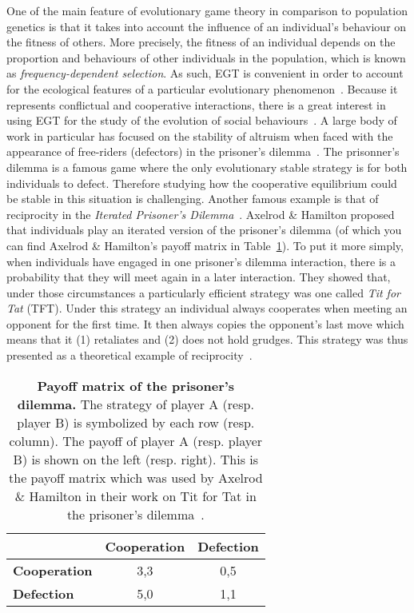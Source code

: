             One of the main feature of evolutionary game theory in comparison to population genetics is that it takes into account the influence of an individual's behaviour on the fitness of others. More precisely, the fitness of an individual depends on the proportion and behaviours of other individuals in the population, which is known as \emph{frequency-dependent selection}. As such, EGT is convenient in order to account for the ecological features of a particular evolutionary phenomenon~\parencite{Hammerstein1994}. Because it represents conflictual and cooperative interactions, there is a great interest in using EGT for the study of the evolution of social behaviours~\parencite{Bshary2015}. A large body of work in particular has focused on the stability of altruism when faced with the appearance of free-riders (defectors) in the prisoner's dilemma~\parencite{Requejo2013a}. The prisonner's dilemma is a famous game where the only evolutionary stable strategy is for both individuals to defect. Therefore studying how the cooperative equilibrium could be stable in this situation is challenging. Another famous example is that of reciprocity in the \emph{Iterated Prisoner's Dilemma}~\parencite{Axelrod1984}. Axelrod \& Hamilton proposed that individuals play an iterated version of the prisoner's dilemma (of which you can find Axelrod \& Hamilton's payoff matrix in Table~\ref{table:payoffIPD}). To put it more simply, when individuals have engaged in one prisoner's dilemma interaction, there is a probability that they will meet again in a later interaction. They showed that, under those circumstances a particularly efficient strategy was one called \emph{Tit for Tat} (TFT). Under this strategy an individual always cooperates when meeting an opponent for the first time. It then always copies the opponent's last move which means that it (1) retaliates and (2) does not hold grudges. This strategy was thus presented as a theoretical example of reciprocity~\parencite{Trivers1971}.


            \begin{table}[ht]
            \centering
              \begin{tabular}{|l|c|c|}
                \hline
                & \textbf{Cooperation} & \textbf{Defection} \\
                \hline
                \hline
                \textbf{Cooperation} & 3,3 & 0,5 \\
                \hline
                \textbf{Defection} & 5,0 & 1,1 \\
                \hline
              \end{tabular}
              \caption{\textbf{Payoff matrix of the prisoner's dilemma.}
              The strategy of player A (resp. player B) is symbolized by each row (resp. column). The payoff of player A (resp. player B) is shown on the left (resp. right). This is the payoff matrix which was used by Axelrod \& Hamilton in their work on Tit for Tat in the prisoner's dilemma~\parencite{Axelrod1984}.}
            \label{table:payoffIPD}
            \end{table}


